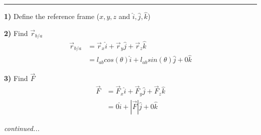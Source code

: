 \documentclass[12pt]{article}
\begin{document}
\begin{example}
  \hrule
  \vspace{12pt}

  \textbf{1)} Define the reference frame ($x, y, z$ and $\hat{i},\hat{j},\hat{k}$)
  \begin{figure}[H]
    \centering
    
  \end{figure}

  \textbf{2)} Find $\overrightarrow{r}_{b/a}$
  \begin{align*}
    \overrightarrow{r}_{b/a} &= \overrightarrow{r}_x\hat{i} + \overrightarrow{r}_y\hat{j} + \overrightarrow{r}_z\hat{k} \\
                             &= l_{ab}cos(\theta)\hat{i} + l_{ab}sin(\theta)\hat{j} + 0\hat{k}
  \end{align*}

  \textbf{3)} Find $\overrightarrow{F}$
  \begin{align*}
    \overrightarrow{F} &= \overrightarrow{F}_x\hat{i} + \overrightarrow{F}_y\hat{j} + \overrightarrow{F}_z\hat{k} \\
                       &= 0\hat{i} + |\overrightarrow{F}|\hat{j} + 0\hat{k}
  \end{align*}

  \textit{\hfill continued...}


\end{example}
\end{document}
